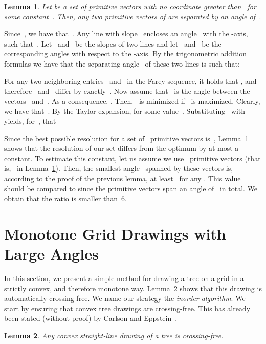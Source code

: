 \documentclass[a4paper,11pt]{article}
\newenvironment{proofMath}{\par\addvspace\topsep\noindent{\bf Proof:} \ignorespaces }{}
\theoremstyle{plain}
\newtheorem{lemma}{Lemma}
\begin{document}
\begin{lemma}\label{lem:primitive_angles}
  Let  be a set of  primitive vectors with
  no coordinate greater than~ for some constant~.  Then, any
  two primitive vectors of  are separated by an angle of~.
\end{lemma}

\begin{proofMath}
Since~, we have that~.
Any line with slope~ encloses an angle~ with the -axis, 
such that~. Let~ and~ be the slopes of two lines 
and let~ and~ be the corresponding angles with respect to 
the -axis. By the trigonometric addition formulas we have that the 
separating angle~ of these two lines is such that:
 
For any two neighboring entries~ and~ in 
the Farey sequence, it holds that  \cite[Theorem~3.1.2]{gw-itn-79}, and 
therefore~ and~  differ by exactly~.  Now assume that~ is the angle 
between the vectors~ and~.  As a 
consequence, . Then,~ is minimized if~
is maximized. Clearly, we have that~. By 
the Taylor expansion,  for some 
value~. Substituting~ with~ yields, 
for~, that

\end{proofMath}

Since the best possible resolution for a set of~ primitive vectors 
is~, Lemma~\ref{lem:primitive_angles} shows that the
resolution of our set differs from the optimum by at most a constant.
To estimate this constant, let us assume we use~ primitive vectors
(that is,~ in Lemma~\ref{lem:primitive_angles}). Then, the smallest 
angle~ spanned by these vectors is, according to the proof of the previous 
lemma, at least~ for any . This value should
be compared to  since the primitive vectors span an angle 
of~ in total. We obtain that the ratio  is smaller than~6. 

\section{Monotone Grid Drawings with Large Angles}
\label{sec:griddrawing}

In this section, we present a simple method for drawing a
tree on a grid in a strictly convex, and therefore monotone way.
Lemma~\ref{lem:crossing-free} shows that this drawing is automatically
crossing-free. We name our strategy the \emph{inorder-algorithm}.
We start by ensuring that convex tree drawings are crossing-free.
This has already been stated (without proof) by Carlson and
Eppstein~\cite{ce-tcfoa-GD06}.
\begin{lemma} 
  \label{lem:crossing-free}
  Any convex straight-line drawing of a tree is crossing-free.
\end{lemma}
\end{document}

